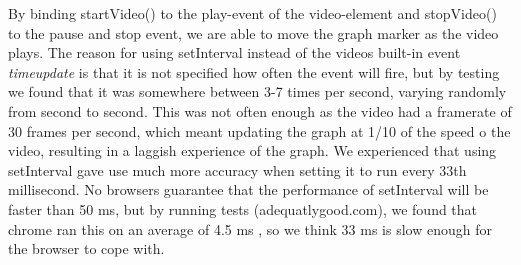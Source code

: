 By binding startVideo() to the play-event of the video-element and stopVideo() to the pause and stop event, we are able to move the graph marker as the video plays. The reason for using setInterval instead of the videos built-in event \emph{timeupdate} is that it is not specified how often the event will fire, but by testing we found that it was somewhere between 3-7 times per second, varying randomly from second to second. This was not often enough as the video had a framerate of 30 frames per second, which meant updating the graph at 1/10 of the speed o the video, resulting in a laggish experience of the graph. We experienced that using setInterval gave use much more accuracy when setting it to run every 33th millisecond. No browsers guarantee that the performance of setInterval will be faster than 50 ms, but by running tests (adequatlygood.com), we found that chrome ran this on an average of 4.5 ms , so we think 33 ms is slow enough for the browser to cope with.